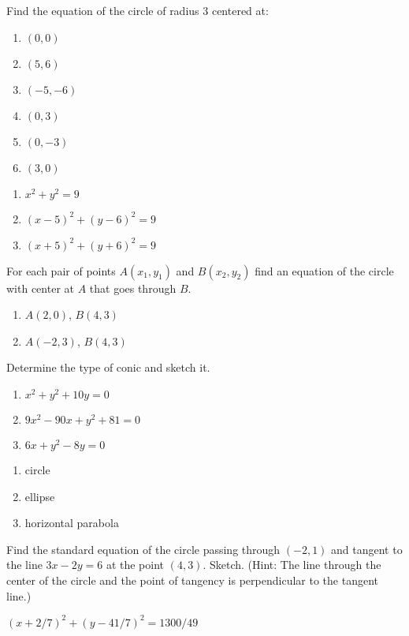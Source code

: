 \begin{enumialphparenastyle}
\begin{ex}
Find the equation of the circle of radius 3 centered at:
\begin{multicols}{2}
\begin{enumerate}
	\item	$(0,0)$
	\item	$(5,6)$
	\item	$(-5,-6)$
	\item	$(0,3)$
	\item	$(0,-3)$
	\item	$(3,0)$
\end{enumerate}
\end{multicols}
\begin{sol}
\begin{enumerate}
	\item	$x^2+y^2=9$
	\item	$(x-5)^2+(y-6)^2=9$
	\item	$(x+5)^2+(y+6)^2=9$
\end{enumerate}
\end{sol}
\end{ex}

\begin{ex}
For each pair of points $A(x_1,y_1)$ and $B(x_2,y_2)$ find an equation of
the circle with center at $A$ that goes through $B$.
\begin{multicols}{2}
\begin{enumerate}
	\item	$A(2,0)$, $B(4,3)$
	\item	$A(-2,3)$, $B(4,3)$
\end{enumerate}
\end{multicols}
\end{ex}

\begin{ex}
Determine the type of conic and sketch it.
\begin{enumerate}
	\item	$x^2+y^2+10y=0$
	\item	$9x^2-90x+y^2+81=0$
	\item	$6x+y^2-8y=0$
\end{enumerate}
\begin{sol}
\begin{enumerate}
	\item	circle
	\item	ellipse
	\item	horizontal parabola
\end{enumerate}
\end{sol}
\end{ex}

\begin{ex} 
Find the standard equation of the circle passing through $(-2,1)$
 and tangent to the line $3x-2y =6$ at the point $(4,3)$.  Sketch. 
 (Hint: The line through the center of the circle and the point of tangency
 is perpendicular to the tangent line.)
\begin{sol}
$(x+2/7)^2+(y-41/7)^2=1300/49$
\end{sol}
\end{ex}

\end{enumialphparenastyle}